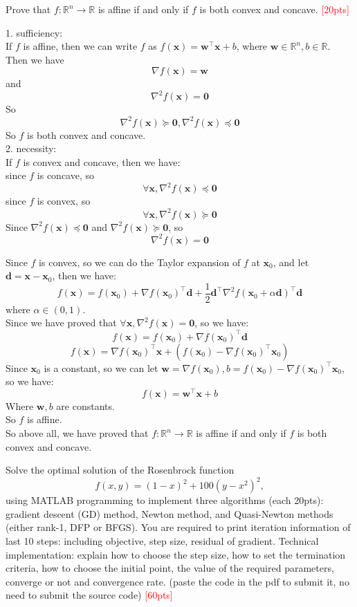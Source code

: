 \documentclass[10pt]{article}
\newenvironment{problem}[2][Problem]{\begin{trivlist}
\item[\hskip \labelsep {\bfseries #1}\hskip \labelsep {\bfseries #2.}]}{\end{trivlist}}
\begin{document}
\newpage

\begin{problem}{2}
    Prove that $f: \mathbb{R}^n \rightarrow \mathbb{R}$ is affine if and only if $f$ is both convex and concave. \textcolor{red}{[20pts]} 
\end{problem}

1. sufficiency:\\
If $f$ is affine, then we can write $f$ as $f(\pmb x)=\pmb w^{\top}\pmb x+b$, where $\pmb w\in \mathbb{R}^n, b\in \mathbb{R}$.\\
Then we have $$\nabla f(\pmb x)=\pmb w$$
and $$\nabla^2 f(\pmb x)=\pmb 0$$
So
$$\nabla^2 f(\pmb x) \succeq \pmb 0, \nabla^2 f(\pmb x) \preceq \pmb 0$$
So $f$ is both convex and concave.\\

2. necessity:\\
If $f$ is convex and concave, then we have:\\
since $f$ is concave, so $$\forall \pmb x, \nabla^2 f(\pmb x) \preceq \pmb 0$$
since $f$ is convex, so $$\forall \pmb x, \nabla^2 f(\pmb x) \succeq \pmb 0$$
Since $\nabla^2 f(\pmb x) \preceq \pmb 0$ and $\nabla^2 f(\pmb x) \succeq \pmb 0$, so $$\nabla^2 f(\pmb x)=\pmb 0$$

Since $f$ is convex, so we can do the Taylor expansion of $f$ at $\pmb x_0$, and let $\pmb d=\pmb x-\pmb x_0$, then we have:
$$f(\pmb x)=f(\pmb x_0) + \nabla f(\pmb x_0)^{\top}{\pmb d}+\dfrac{1}{2}{\pmb d}^{\top}\nabla^2 f(\pmb x_0 + \alpha\pmb d)^{\top}{\pmb d}$$
where $\alpha\in(0,1)$.\\
Since we have proved that $\forall \pmb x,\nabla^2 f(\pmb x)=\pmb 0$, so we have:
$$f(\pmb x)=f(\pmb x_0) + \nabla f(\pmb x_0)^{\top}{\pmb d}$$
$$f(\pmb x)=\nabla f(\pmb x_0)^{\top}{\pmb x}+(f(\pmb x_0)-\nabla f(\pmb x_0)^{\top}{\pmb x_0})$$
Since $\pmb x_0$ is a constant, so we can let $\pmb w = \nabla f(\pmb x_0), b=f(\pmb x_0)-\nabla f(\pmb x_0)^{\top}{\pmb x_0}$, so we have:
$$f(\pmb x)={\pmb w}^{\top}{\pmb x}+b$$
Where $\pmb w, b$ are constants.\\ 
So $f$ is affine.\\

So above all, we have proved that $f:\mathbb{R}^n\rightarrow \mathbb{R}$ is affine if and only if $f$ is both convex and concave.

\newpage

\begin{problem}{3}
    Solve the optimal solution of the Rosenbrock function $$f(x, y) = (1 - x)^2 + 100(y - x^2)^2, $$ using MATLAB programming to implement three algorithms (each 20pts): gradient descent (GD) method, Newton method, and Quasi-Newton methods (either rank-1, DFP or BFGS). You are required to print iteration information of last 10 steps: including objective, step size, residual of gradient. Technical implementation: explain how to choose the step size, how to set the termination criteria, how to choose the initial point, the value of the required parameters, converge or not and convergence rate. (paste the code in the pdf to submit it, no need to submit the source code) \textcolor{red}{[60pts]}
\end{problem}
\end{document}

